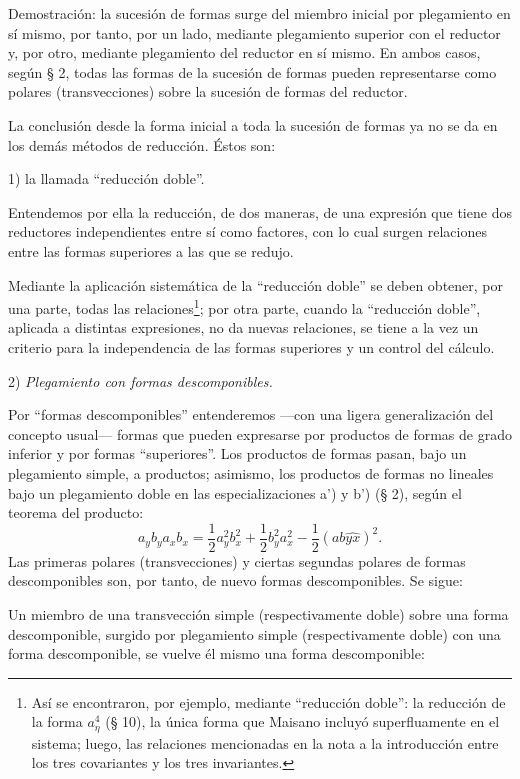 \documentclass[11pt]{article}
\begin{document}
Demostración: la sucesión de formas surge del miembro inicial por plegamiento en sí mismo, por tanto, por un lado, mediante plegamiento superior con el reductor y, por otro, mediante plegamiento del reductor en sí mismo. En ambos casos, según § 2, todas las formas de la sucesión de formas pueden representarse como polares (transvecciones) sobre la sucesión de formas del reductor.

La conclusión desde la forma inicial a toda la sucesión de formas ya no se da en los demás métodos de reducción. Éstos son:

1) la llamada ``reducción doble''.

Entendemos por ella la reducción, de dos maneras, de una expresión que tiene dos reductores independientes entre sí como factores, con lo cual surgen relaciones entre las formas superiores a las que se redujo.

Mediante la aplicación sistemática de la ``reducción doble'' se deben obtener, por una parte, todas las relaciones\footnote{Así se encontraron, por ejemplo, mediante ``reducción doble'': la reducción de la forma $a_\eta^4$ (§ 10), la única forma que Maisano incluyó superfluamente en el sistema; luego, las relaciones mencionadas en la nota a la introducción entre los tres covariantes y los tres invariantes.}; por otra parte, cuando la ``reducción doble'', aplicada a distintas expresiones, no da nuevas relaciones, se tiene a la vez un criterio para la independencia de las formas superiores y un control del cálculo.

2) \emph{Plegamiento con formas descomponibles.}

Por ``formas descomponibles'' entenderemos ---con una ligera generalización del concepto usual--- formas que pueden expresarse por productos de formas de grado inferior y por formas ``superiores''. Los productos de formas pasan, bajo un plegamiento simple, a productos; asimismo, los productos de formas no lineales bajo un plegamiento doble en las especializaciones a') y b') (§ 2), según el teorema del producto:
\[
a_yb_y a_xb_x=\frac12a_y^2b_x^2+\frac12b_y^2a_x^2-\frac12(ab\widehat{yx})^2.
\]
Las primeras polares (transvecciones) y ciertas segundas polares de formas descomponibles son, por tanto, de nuevo formas descomponibles. Se sigue:

Un miembro de una transvección simple (respectivamente doble) sobre una forma descomponible, surgido por plegamiento simple (respectivamente doble) con una forma descomponible, se vuelve él mismo una forma descomponible:
\end{document}
